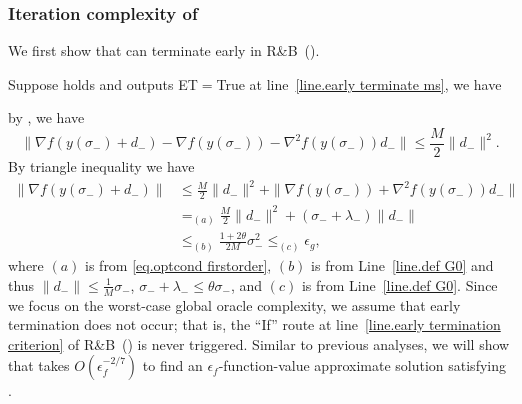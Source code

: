 \documentclass[moor,sglanonrev]{informs4}
\begin{document}
\subsubsection{Iteration complexity of }
We first show that  can terminate early in R\&B~().
\begin{lemma}
    \label{lem.early termination ms}
    Suppose  holds and  outputs ET$=$True at line~\ref{line.early terminate ms}, we have
\end{lemma}
by , we have
\begin{equation*}
    \|\nabla f(y(\sigma_-)+d_-)-\nabla f(y(\sigma_-))-\nabla^2 f(y(\sigma_-))d_-\|\leq \frac{M}{2}\|d_-\|^2.
\end{equation*}
By triangle inequality we have
\begin{equation*}
    \begin{aligned}
        \|\nabla f(y(\sigma_-)+d_-)\| & \leq \frac{M}{2}\|d_-\|^2+\| \nabla f(y(\sigma_-))+\nabla^2 f(y(\sigma_-))d_-\| \\
                                      & =_{(a)} \frac{M}{2}\|d_-\|^2+(\sigma_-+\lambda_-) \|d_-\|                       \\
                                      & \leq_{(b)} \frac{1+2\theta}{2M}\sigma_-^2  \leq_{(c)} \epsilon_g,
    \end{aligned}
\end{equation*}
{\color{red} where $(a)$ is from \eqref{eq.optcond firstorder}, $(b)$ is from Line~\ref{line.def G0} and thus $\|d_-\| \leq \frac{1}{M}\sigma_-$, $\sigma_-+\lambda_-\leq \theta\sigma_-$, and $(c)$ is from Line~\ref{line.def G0}.}
\Halmos \endproof
Since we focus on the worst-case global oracle complexity, we assume that early termination does not occur; that is, the ``If'' route at line~\ref{line.early termination criterion} of R\&B~() is never triggered. Similar to previous analyses, we will show that  takes $O(\epsilon_f^{-2/7})$ to find an $\epsilon_f$-function-value approximate solution satisfying .
\end{document}
